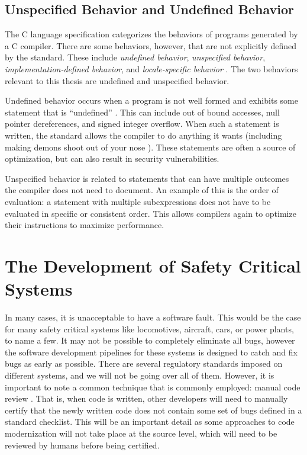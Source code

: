 \subsection{Unspecified Behavior and Undefined Behavior}
The C language specification categorizes the behaviors of programs generated by a C compiler. There are some behaviors, however, that are not explicitly defined by the standard. These include \textit{undefined behavior}, \textit{unspecified behavior}, \textit{implementation-defined behavior}, and \textit{locale-specific behavior} \cite{c_standard}. The two behaviors relevant to this thesis are undefined and unspecified behavior.

Undefined behavior occurs when a program is not well formed and exhibits some statement that is ``undefined'' \cite{c_standard}. This can include out of bound accesses, null pointer dereferences, and signed integer overflow. When such a statement is written, the standard allows the compiler to do anything it wants (including making demons shoot out of your nose \cite{nasal_demons}). These statements are often a source of optimization, but can also result in security vulnerabilities.

Unspecified behavior is related to statements that can have multiple outcomes the compiler does not need to document. An example of this is the order of evaluation: a statement with multiple subexpressions does not have to be evaluated in specific or consistent order. This allows compilers again to optimize their instructions to maximize performance.

\section{The Development of Safety Critical Systems}

In many cases, it is unacceptable to have a software fault. This would be the case for many safety critical systems like locomotives, aircraft, cars, or power plants, to name a few. It may not be possible to completely eliminate all bugs, however the software development pipelines for these systems is designed to catch and fix bugs as early as possible. There are several regulatory standards imposed on different systems, and we will not be going over all of them. However, it is important to note a common technique that is commonly employed: manual code review \cite{faa}\cite{do}. That is, when code is written, other developers will need to manually certify that the newly written code does not contain some set of bugs defined in a standard checklist. This will be an important detail as some approaches to code modernization will not take place at the source level, which will need to be reviewed by humans before being certified. 

